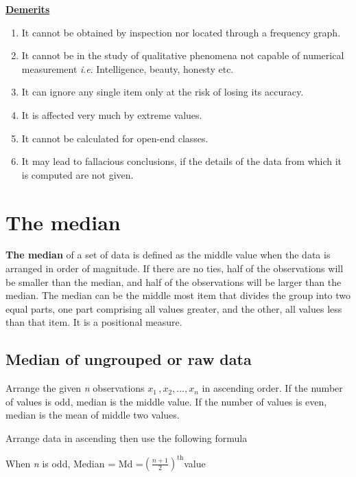 \documentclass[
]{book}
\begin{document}
\underline{\textbf{Demerits}}

\begin{enumerate}
\def\labelenumi{\arabic{enumi}.}
\item
  It cannot be obtained by inspection nor located through a frequency
  graph.
\item
  It cannot be in the study of qualitative phenomena not capable of
  numerical measurement \emph{i}.\emph{e}. Intelligence, beauty, honesty etc.
\item
  It can ignore any single item only at the risk of losing its
  accuracy.
\item
  It is affected very much by extreme values.
\item
  It cannot be calculated for open-end classes.
\item
  It may lead to fallacious conclusions, if the details of the data
  from which it is computed are not given.
\end{enumerate}

\hypertarget{the-median}{%
\section{The median}\label{the-median}}

\textbf{The median} of a set of data is defined as the middle value when the
data is arranged in order of magnitude. If there are no ties, half of
the observations will be smaller than the median, and half of the
observations will be larger than the median. The median can be the
middle most item that divides the group into two equal parts, one part
comprising all values greater, and the other, all values less than that
item. It is a positional measure.

\hypertarget{median-of-ungrouped-or-raw-data}{%
\subsection{Median of ungrouped or raw data}\label{median-of-ungrouped-or-raw-data}}

Arrange the given \emph{n} observations \(x_{1\ },x_{2},\ldots,x_{n}\) in
ascending order. If the number of values is odd, median is the middle
value. If the number of values is even, median is the mean of middle two
values.

Arrange data in ascending then use the following formula

When \emph{n} is odd, Median = Md
=\(\left( \frac{n + 1}{2} \right)^{\text{th}}\)value
\end{document}
